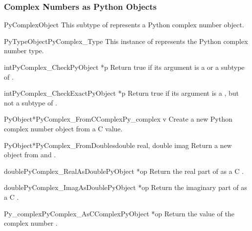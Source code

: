 \subsubsection{Complex Numbers as Python Objects}

\begin{ctypedesc}{PyComplexObject}
  This subtype of  represents a Python complex number
  object.
\end{ctypedesc}

\begin{cvardesc}{PyTypeObject}{PyComplex_Type}
  This instance of  represents the Python complex
  number type.
\end{cvardesc}

\begin{cfuncdesc}{int}{PyComplex_Check}{PyObject *p}
  Return true if its argument is a  or a
  subtype of .
\end{cfuncdesc}

\begin{cfuncdesc}{int}{PyComplex_CheckExact}{PyObject *p}
  Return true if its argument is a , but not a
  subtype of .
\end{cfuncdesc}

\begin{cfuncdesc}{PyObject*}{PyComplex_FromCComplex}{Py_complex v}
  Create a new Python complex number object from a C
   value.
\end{cfuncdesc}

\begin{cfuncdesc}{PyObject*}{PyComplex_FromDoubles}{double real, double imag}
  Return a new  object from  and
  .
\end{cfuncdesc}

\begin{cfuncdesc}{double}{PyComplex_RealAsDouble}{PyObject *op}
  Return the real part of  as a C .
\end{cfuncdesc}

\begin{cfuncdesc}{double}{PyComplex_ImagAsDouble}{PyObject *op}
  Return the imaginary part of  as a C .
\end{cfuncdesc}

\begin{cfuncdesc}{Py_complex}{PyComplex_AsCComplex}{PyObject *op}
  Return the  value of the complex number
  .
\end{cfuncdesc}



